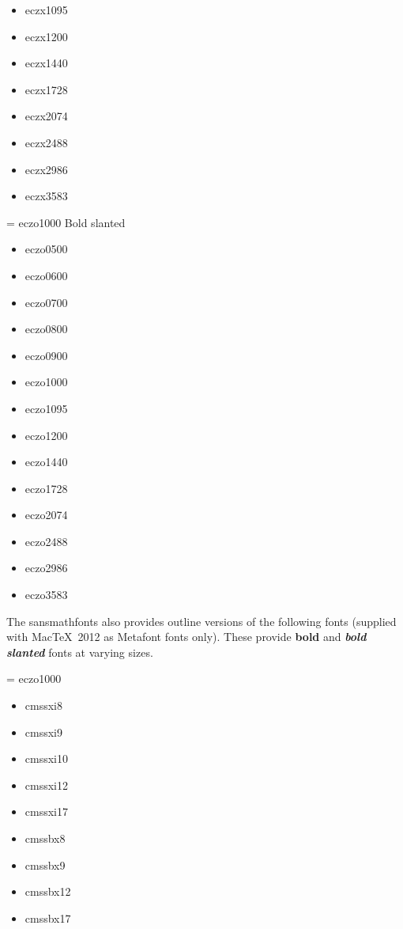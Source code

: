 \documentclass{amsart}
\begin{document}
{\begin{itemize}
\item \textsf{eczx1095}
\item \textsf{eczx1200}
\item \textsf{eczx1440}
\item \textsf{eczx1728}
\item \textsf{eczx2074}
\item \textsf{eczx2488}
\item \textsf{eczx2986}
\item \textsf{eczx3583}
\end{itemize}
}\parbox[t]{0.25\textwidth}{
\font\temp = eczo1000 \temp
Bold slanted
\begin{itemize}
\item \textsf{eczo0500}
\item \textsf{eczo0600}
\item \textsf{eczo0700}
\item \textsf{eczo0800}
\item \textsf{eczo0900}
\item \textsf{eczo1000}
\item \textsf{eczo1095}
\item \textsf{eczo1200}
\item \textsf{eczo1440}
\item \textsf{eczo1728}
\item \textsf{eczo2074}
\item \textsf{eczo2488}
\item \textsf{eczo2986}
\item \textsf{eczo3583}
\end{itemize}
}

\bigskip

The \textsf{sansmathfonts} also provides outline versions of the following fonts (supplied with Mac\TeX\ 2012 as Metafont fonts only). These provide \textsf{\textbf{bold}} and \textsf{\textsl{\textbf{bold slanted}}} fonts at varying sizes.

\noindent\parbox[t]{0.25\textwidth}{
\font\temp = eczo1000 \temp
\begin{itemize}
\item \textsf{cmssxi8}
\item \textsf{cmssxi9}
\item \textsf{cmssxi10}
\end{itemize}
}\parbox[t]{0.25\textwidth}{
\begin{itemize}
\item \textsf{cmssxi12}
\item \textsf{cmssxi17}
\end{itemize}
}\parbox[t]{0.25\textwidth}{
\begin{itemize}
\item \textsf{cmssbx8}
\item \textsf{cmssbx9}
\end{itemize}
}\parbox[t]{0.25\textwidth}{
\begin{itemize}
\item \textsf{cmssbx12}
\item \textsf{cmssbx17}
\end{itemize}
}
\end{document}
